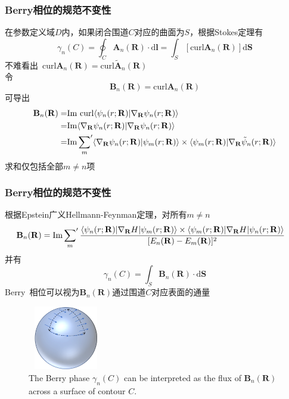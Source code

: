 \frame
{
	\frametitle{\rm{Berry}相位的规范不变性}
	在参数定义域$D$内，如果闭合围道$C$对应的曲面为$S$，根据\textrm{Stokes}定理有
	\begin{displaymath}
		\gamma_n(C)=\oint_C\mathbf{A}_n(\mathbf{R})\cdot\mathrm{d}\mathbf{l}=\int_S[\mathrm{curl}\mathbf{A}_n(\mathbf{R})]\mathrm{d}\mathbf{S}
	\end{displaymath}
	不难看出~$\mathrm{curl}\mathbf{A}_n(\mathbf{R})=\mathrm{curl}\tilde{\mathbf{A}}_n(\mathbf{R})$\\
	令
	\begin{displaymath}
		\mathbf{B}_n(\mathbf{R})=\mathrm{curl}\mathbf{A}_n(\mathbf{R})
	\end{displaymath}
	可导出
	\begin{displaymath}
		\begin{aligned}
			\mathbf{B}_n(\mathbf{R})=&\mathrm{Im}~\mathrm{curl}\langle\psi_n(r;\mathbf{R})|\nabla_{\mathbf{R}}\psi_n(r;\mathbf{R})\rangle\\
			=&\mathrm{Im}\langle\nabla_{\mathbf{R}}\psi_n(r;\mathbf{R})|\nabla_{\mathbf{R}}\psi_n(r;\mathbf{R})\rangle\\
			=&\mathrm{Im}\sideset{}{^{\prime}}\sum_{m}\langle\nabla_{\mathbf{R}}\psi_n(r;\mathbf{R})|\psi_m(r;\mathbf{R})\rangle\times\langle\psi_m(r;\mathbf{R})|\nabla_{\mathbf{R}}\tilde{\psi}_n(r;\mathbf{R})\rangle\\
		\end{aligned}
	\end{displaymath}
	求和仅包括全部$m\neq n$项
}

\frame
{
	\frametitle{\rm{Berry}相位的规范不变性}
	根据\textrm{Epstein}广义\textrm{Hellmann-Feynman}定理，对所有$m\neq n$
	\begin{displaymath}
		\hspace*{-10pt}
		\mathbf{B}_n(\mathbf{R})=\mathrm{Im}\sideset{}{^{\prime}}\sum_{m}\dfrac{\langle\psi_n(r;\mathbf{R})|\nabla_{\mathbf{R}}H|\psi_m(r;\mathbf{R})\rangle\times\langle\psi_m(r;\mathbf{R})|\nabla_{\mathbf{R}}H|\psi_n(r;\mathbf{R})\rangle}{[E_n(\mathbf{R})-E_m(\mathbf{R})]^2}
	\end{displaymath}
	并有
	\begin{displaymath}
		\gamma_n(C)=\int_S\mathbf{B}_n(\mathbf{R})\cdot\mathrm{d}\mathbf{S}
	\end{displaymath}
	\textrm{Berry~}相位可以视为$\mathbf{B}_n(\mathbf{R})$通过围道$C$对应表面的通量
\begin{figure}[h!]
\centering
\vspace*{-0.05in}
\includegraphics[height=1.1in,width=1.3in,viewport=0 0 500 420,clip]{Figures/Berry_Phase-2.png}
\caption{\tiny \textrm{The Berry phase $\gamma_n(C)$ can be interpreted as the flux of $\mathbf{B}_n(\mathbf{R})$ across a surface of contour $C$.}}%
\label{Berry-Phase-2}
\end{figure} 
}

